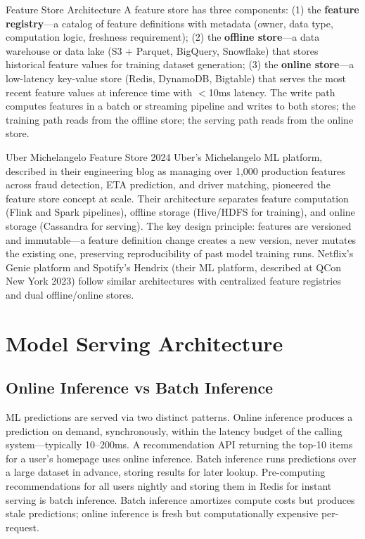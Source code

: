 \documentclass[11pt,a4paper]{article}
\begin{document}
\begin{termbox}{Feature Store Architecture}
A feature store has three components: (1) the \textbf{feature registry}---a catalog of feature definitions with metadata (owner, data type, computation logic, freshness requirement); (2) the \textbf{offline store}---a data warehouse or data lake (S3 + Parquet, BigQuery, Snowflake) that stores historical feature values for training dataset generation; (3) the \textbf{online store}---a low-latency key-value store (Redis, DynamoDB, Bigtable) that serves the most recent feature values at inference time with $<$10ms latency. The write path computes features in a batch or streaming pipeline and writes to both stores; the training path reads from the offline store; the serving path reads from the online store.
\end{termbox}

\begin{industrybox}{Uber Michelangelo Feature Store 2024}
Uber's Michelangelo ML platform, described in their engineering blog as managing over 1,000 production features across fraud detection, ETA prediction, and driver matching, pioneered the feature store concept at scale. Their architecture separates feature computation (Flink and Spark pipelines), offline storage (Hive/HDFS for training), and online storage (Cassandra for serving). The key design principle: features are versioned and immutable---a feature definition change creates a new version, never mutates the existing one, preserving reproducibility of past model training runs. Netflix's Genie platform and Spotify's Hendrix (their ML platform, described at QCon New York 2023) follow similar architectures with centralized feature registries and dual offline/online stores.
\end{industrybox}

\section{Model Serving Architecture}

\subsection{Online Inference vs Batch Inference}

ML predictions are served via two distinct patterns. Online inference produces a prediction on demand, synchronously, within the latency budget of the calling system---typically 10--200ms. A recommendation API returning the top-10 items for a user's homepage uses online inference. Batch inference runs predictions over a large dataset in advance, storing results for later lookup. Pre-computing recommendations for all users nightly and storing them in Redis for instant serving is batch inference. Batch inference amortizes compute costs but produces stale predictions; online inference is fresh but computationally expensive per-request.
\end{document}
